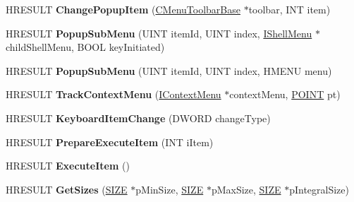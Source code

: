 \begin{DoxyCompactItemize}
\item 
\mbox{\label{class_c_menu_toolbar_base_a6c46083bafaddb69f1bcadc9774f2aaa}} 
H\+R\+E\+S\+U\+LT {\bfseries Change\+Popup\+Item} (\hyperlink{class_c_menu_toolbar_base}{C\+Menu\+Toolbar\+Base} $\ast$toolbar, I\+NT item)
\item 
\mbox{\label{class_c_menu_toolbar_base_a01b306a18590b281895c084e5c7ff77f}} 
H\+R\+E\+S\+U\+LT {\bfseries Popup\+Sub\+Menu} (U\+I\+NT item\+Id, U\+I\+NT index, \hyperlink{interface_i_shell_menu}{I\+Shell\+Menu} $\ast$child\+Shell\+Menu, B\+O\+OL key\+Initiated)
\item 
\mbox{\label{class_c_menu_toolbar_base_a0c523e9a0a9b32dbf4fd7305ae216a3f}} 
H\+R\+E\+S\+U\+LT {\bfseries Popup\+Sub\+Menu} (U\+I\+NT item\+Id, U\+I\+NT index, H\+M\+E\+NU menu)
\item 
\mbox{\label{class_c_menu_toolbar_base_a971ddcd6e00abea67adc654f7267e1ef}} 
H\+R\+E\+S\+U\+LT {\bfseries Track\+Context\+Menu} (\hyperlink{interface_i_context_menu}{I\+Context\+Menu} $\ast$context\+Menu, \hyperlink{structtag_p_o_i_n_t}{P\+O\+I\+NT} pt)
\item 
\mbox{\label{class_c_menu_toolbar_base_a57ccb573e02be118ea4a610532babe0d}} 
H\+R\+E\+S\+U\+LT {\bfseries Keyboard\+Item\+Change} (D\+W\+O\+RD change\+Type)
\item 
\mbox{\label{class_c_menu_toolbar_base_a90e62bfd27954e336aa10fc0d9a6246c}} 
H\+R\+E\+S\+U\+LT {\bfseries Prepare\+Execute\+Item} (I\+NT i\+Item)
\item 
\mbox{\label{class_c_menu_toolbar_base_a20cd67104a163be1ce08b771863220dd}} 
H\+R\+E\+S\+U\+LT {\bfseries Execute\+Item} ()
\item 
\mbox{\label{class_c_menu_toolbar_base_a0552e6db03fe93b3e15421a350eb4b19}} 
H\+R\+E\+S\+U\+LT {\bfseries Get\+Sizes} (\hyperlink{structtag_s_i_z_e}{S\+I\+ZE} $\ast$p\+Min\+Size, \hyperlink{structtag_s_i_z_e}{S\+I\+ZE} $\ast$p\+Max\+Size, \hyperlink{structtag_s_i_z_e}{S\+I\+ZE} $\ast$p\+Integral\+Size)
\item 

\end{DoxyCompactItemize}
